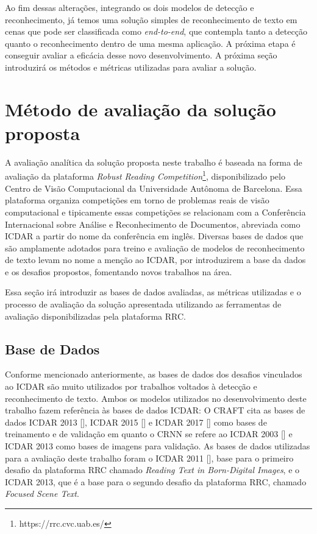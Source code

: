 Ao fim dessas alterações, integrando os dois modelos de detecção e reconhecimento, já temos uma solução simples de reconhecimento de texto em cenas que pode ser classificada como \textit{end-to-end}, que contempla tanto a detecção quanto o reconhecimento dentro de uma mesma aplicação. A próxima etapa é conseguir avaliar a eficácia desse novo desenvolvimento. A próxima seção introduzirá os métodos e métricas utilizadas para avaliar a solução.

\section{Método de avaliação da solução proposta}\label{sec:methodology_validation}

A avaliação analítica da solução proposta neste trabalho é baseada na forma de avaliação da plataforma \textit{Robust Reading Competition}\footnote{https://rrc.cvc.uab.es/}, disponibilizado pelo Centro de Visão Computacional da Universidade Autônoma de Barcelona. Essa plataforma organiza competições em torno de problemas reais de visão computacional e tipicamente essas competições se relacionam com a Conferência Internacional sobre Análise e Reconhecimento de Documentos, abreviada como ICDAR a partir do nome da conferência em inglês. Diversas bases de dados que são amplamente adotados para treino e avaliação de modelos de reconhecimento de texto levam no nome a menção ao ICDAR, por introduzirem a base da dados e os desafios propostos, fomentando novos trabalhos na área.

Essa seção irá introduzir as bases de dados avaliadas, as métricas utilizadas e o processo de avaliação da solução apresentada utilizando as ferramentas de avaliação disponibilizadas pela plataforma RRC.

\subsection{Base de Dados}\label{sec:methodology_datasets}

Conforme mencionado anteriormente, as bases de dados dos desafios vinculados ao ICDAR são muito utilizados por trabalhos voltados à detecção e reconhecimento de texto. Ambos os modelos utilizados no desenvolvimento deste trabalho fazem referência às bases de dados ICDAR: O CRAFT cita as bases de dados ICDAR 2013 [], ICDAR 2015 [] e ICDAR 2017 [] como bases de treinamento e de validação em quanto o CRNN se refere ao ICDAR 2003 [] e ICDAR 2013 como bases de imagens para validação. As bases de dados utilizadas para a avaliação deste trabalho foram o ICDAR 2011 [], base para o primeiro desafio da plataforma RRC chamado \textit{Reading Text in Born-Digital Images}, e o ICDAR 2013, que é a base para o segundo desafio da plataforma RRC, chamado \textit{Focused Scene Text}.

